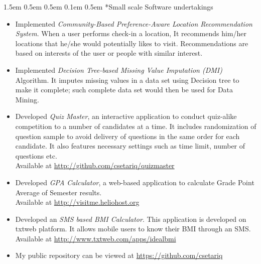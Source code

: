 \documentclass[a4paper, 12pt]{article}
\makeatletter
\renewcommand\section{\@startsection{section}{1}{\z@}%
                                  {1.5em \@plus 0.5em \@minus 0.5em}%
                                  {0.1em \@plus 0.5em}%
                                  {\small\bfseries\sc}}
\makeatother
\begin{document}
\section*{Small scale Software undertakings}
\begin{adjustwidth}{1.3em}{0pt}
\begin{itemize}
  \item Implemented \emph{Community-Based Preference-Aware Location
  Recommendation System}. When a user performs check-in a location, It
  recommends him/her locations that he/she would potentially likes to visit.
  Recommendations are based on interests of the user or people with similar
  interest.

  \item Implemented \emph{Decision Tree-based Missing Value Imputation (DMI)}
  Algorithm. It imputes missing values in a data set using Decision tree to make
  it complete; such complete data set would then be used for Data Mining.

       \item Developed \emph{Quiz Master}, an interactive application to conduct
  quiz-alike competition to a number of candidates at a time. It includes
  randomization of question sample to avoid delivery of questions in the same
  order for each candidate. It also features necessary settings such as time
  limit, number of questions etc.\\
  Available at \url{http://github.com/csetariq/quizmaster}

  \item Developed \emph{GPA Calculator}, a web-based application to calculate
  Grade Point Average of Semester results.\\
  Available at \url{http://visitme.heliohost.org}

  \item Developed an \emph{SMS based BMI Calculator}. This application is
  developed on txtweb platform. It allows mobile users to know their BMI through
  an SMS.\\
  Available at \url{http://www.txtweb.com/apps/idealbmi}

  \item My public repository can be viewed at \url{https://github.com/csetariq}

\end{itemize}
\end{adjustwidth}
\end{document}

